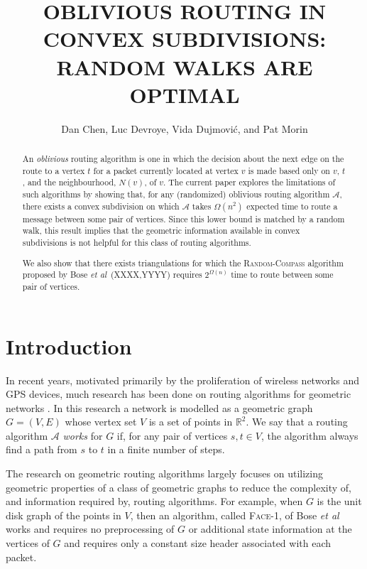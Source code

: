 \documentclass [letterpaper] {patmorin}
\title{\MakeUppercase{Oblivious Routing in Convex Subdivisions: \newline 
       Random Walks are Optimal}}
\author{Dan Chen, Luc Devroye, Vida Dujmovi\'c, and Pat Morin}
\newcommand{\R}{\mathbb{R}}
\newcommand{\etal}{\emph{et al}}
\begin{document}
\maketitle

\begin{abstract}
An \emph{oblivious} routing algorithm is one in which the decision about
the next edge on the route to a vertex $t$ for a packet currently located
at vertex $v$ is made based only on $v$, $t$, and the neighbourhood,
$N(v)$, of $v$.  The current paper explores the limitations of such
algorithms by showing that, for any (randomized) oblivious routing
algorithm $\mathcal{A}$, there exists a convex subdivision on which
$\mathcal{A}$ takes $\Omega(n^2)$ expected time to route a message between
some pair of vertices.  Since this lower bound is matched by a random walk,
this result implies that the geometric information available in convex
subdivisions is not helpful for this class of routing algorithms.

We also show that there exists triangulations for which the
\textsc{Random-Compass} algorithm proposed by Bose \etal\ (XXXX,YYYY)
requires $2^{\Omega(n)}$ time to route between some pair of vertices.


\end{abstract}

\section{Introduction}
\label{sec:intro}

In recent years, motivated primarily by the proliferation of wireless networks and GPS devices, much research has been done on routing algorithms for geometric networks \cite{gior03}.  In this research a network is modelled as a geometric graph $G=(V,E)$ whose vertex set $V$ is a set of points in $\R^2$. We say that a routing algorithm $\mathcal{A}$ \emph{works} for $G$ if, for any pair of vertices $s,t\in V$, the algorithm always find a path from $s$ to $t$ in a finite number of steps.

The research on geometric routing algorithms largely focuses on utilizing geometric properties of a class of geometric graphs to reduce the complexity of, and information required by, routing algorithms.  For example, when $G$ is the unit disk graph of the points in $V$, then an algorithm, called \textsc{Face-1}, of Bose \etal\ \cite{bose01} works and requires no preprocessing of $G$ or additional state information at the vertices of $G$ and requires only a constant size header associated with each packet.
\end{document}
